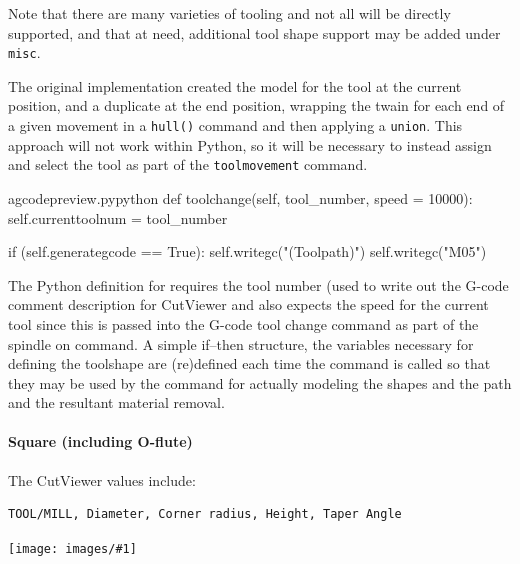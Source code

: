 \documentclass{ltxdoc}
\newcommand{\includeimage}[1]{\bigskip\noindent\texttt{[image: images/\#1]}\bigskip}
\begin{document}

Note that there are many varieties of tooling and not all will be directly supported, and that at need, additional tool shape support may be added under \verb|misc|.
 
The original implementation created the model for the tool at the current position, and a duplicate at the end position, wrapping the twain for each end of a given movement in a \verb|hull()| command and then applying a \verb|union|. This approach will not work within Python, so it will be necessary to instead assign and select the tool as part of the \verb|toolmovement| command.

\lstset{firstnumber=\thegcpy}
\begin{writecode}{a}{gcodepreview.py}{python}
    def toolchange(self, tool_number, speed = 10000):
        self.currenttoolnum = tool_number

        if (self.generategcode == True):
            self.writegc("(Toolpath)")
            self.writegc("M05")

\end{writecode}
\addtocounter{gcpy}{7}

The Python definition for  requires the tool number (used to write out the G-code comment description for CutViewer and also expects the speed for the current tool since this is passed into the G-code tool change command as part of the spindle on command. A simple if--then structure, the variables necessary for defining the toolshape are (re)defined each time the command is called so that they may be used by the command  for actually modeling the shapes and the path and the resultant material removal.

\paragraph{Square (including O-flute)}

The CutViewer values include:

\begin{verbatim}
TOOL/MILL, Diameter, Corner radius, Height, Taper Angle
\end{verbatim}

\includeimage{cutviewer_tool_mill.png}
\end{document}
